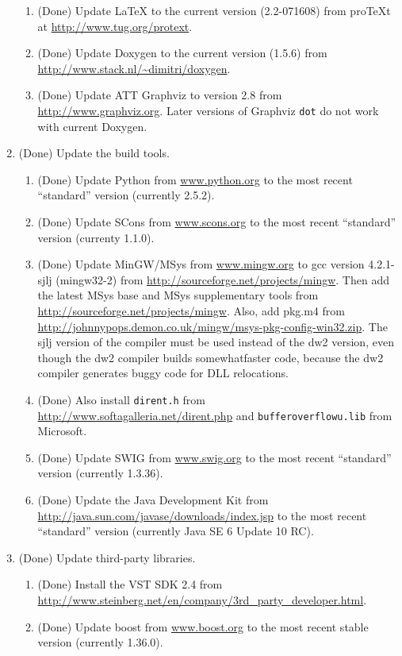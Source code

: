 \documentclass[11pt,letterpaper,onecolumn]{scrartcl}
\begin{document}
\begin{sloppypar}
\begin{enumerate}
\begin{enumerate}
	    \item (Done) Update LaTeX to the current version (2.2-071608) from proTeXt at \url{http://www.tug.org/protext}.
	    \item (Done) Update Doxygen to the current version (1.5.6) from \url{http://www.stack.nl/~dimitri/doxygen}.
	    \item (Done) Update ATT Graphviz to version 2.8 from \url{http://www.graphviz.org}. Later versions of Graphviz \texttt{dot} do not work with current Doxygen.
		\end{enumerate}
	\item (Done) Update the build tools.   
		\begin{enumerate}
  		\item (Done) Update Python from \url{www.python.org} to the most recent ``standard'' version (currently 2.5.2).
	    \item (Done) Update SCons from \url{www.scons.org} to the most recent ``standard'' version (currenty 1.1.0).
			\item (Done) Update MinGW/MSys from \url{www.mingw.org} to gcc version 4.2.1-sjlj (mingw32-2) from \url{http://sourceforge.net/projects/mingw}. Then add the latest MSys base and MSys supplementary tools from \url{http://sourceforge.net/projects/mingw}. Also, add pkg.m4 from \url{http://johnnypops.demon.co.uk/mingw/msys-pkg-config-win32.zip}. The sjlj version of the compiler must be used instead of the dw2 version, even though the dw2 compiler builds somewhatfaster code, because the dw2 compiler generates buggy code for DLL relocations.
			\item (Done) Also install \texttt{dirent.h} from \url{http://www.softagalleria.net/dirent.php} and \texttt{bufferoverflowu.lib}  from Microsoft.
	    \item (Done) Update SWIG from \url{www.swig.org} to the most recent ``standard'' version (currently 1.3.36).
	    \item (Done) Update the Java Development Kit from \url{http://java.sun.com/javase/downloads/index.jsp} to the most recent ``standard'' version (currently Java SE 6 Update 10 RC).
		\end{enumerate}    
	\item (Done) Update third-party libraries.   
		\begin{enumerate}
    	\item (Done) Install the VST SDK 2.4 from \url{http://www.steinberg.net/en/company/3rd_party_developer.html}.
   		\item (Done) Update boost from \url{www.boost.org} to the most recent stable version (currently 1.36.0).

\end{enumerate}
\end{enumerate}
\end{sloppypar}
\end{document}
